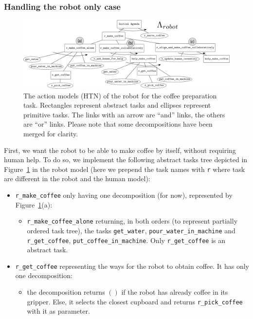 \documentclass[a4paper,11pt,twoside]{StyleThese}
\begin{document}
\subsubsection{Handling the robot only case}
\label{subsubsec:chap4coffeerobotonly}
\begin{figure}[hbtp]
\centering
\includegraphics[height=0.5\textwidth, angle=90, origin=c]{figures/chapter4/HTN_r_coffee.png}
\caption{The action models (HTN) of the robot for the coffee preparation task. Rectangles represent abstract tasks and ellipses represent primitive tasks. The links with an arrow are ``and'' links, the others are ``or'' links. Please note that some decompositions have been merged for clarity.}
\label{fig:chap4rhtncoffee}
\end{figure}

First, we want the robot to be able to make coffee by itself, without requiring human help. To do so, we implement the following abstract tasks tree depicted in Figure~\ref{fig:chap4rhtncoffee} in the robot model (here we prepend the task names with \verb'r' where task are different in the robot and the human model):

\begin{itemize}
\item \verb'r_make_coffee' only having one decomposition (for now), represented by Figure~\ref{fig:chap4rhtncoffee}(a):
	\begin{itemize}
	\item \verb'r_make_coffee_alone' returning, in both orders (to represent partially ordered task tree), the tasks \verb'get_water', \verb'pour_water_in_machine' and \verb'r_get_coffee', \verb'put_coffee_in_machine'. Only \verb'r_get_coffee' is an abstract task.
	\end{itemize}
\item \verb'r_get_coffee' representing the ways for the robot to obtain coffee. It has only one decomposition:
	\begin{itemize}
	\item the decomposition returns $()$ if the robot has already coffee in its gripper. Else, it selects the closest cupboard and returns \verb'r_pick_coffee' with it as parameter.
	\end{itemize}
\end{itemize}
\end{document}
